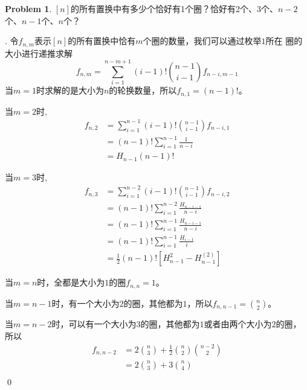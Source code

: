 \documentclass[UTF8]{ctexart}
\newenvironment{sol}
  {\par\vspace{3mm}\noindent{\it Solution}.}
  {\qed \\ \medskip}
\theoremstyle{definition}
\newtheorem{problem}{Problem}
\begin{document}
\begin{problem}
$[n]$的所有置换中有多少个恰好有1个圈？恰好有2个、3个、$n-2$个、$n-1$个、$n$个？

\begin{sol}
  令$f_{n,m}$表示$[n]$的所有置换中恰有$m$个圈的数量，我们可以通过枚举$1$所在
  圈的大小进行递推求解
  $$
  f_{n,m}=\sum_{i=1}^{n-m+1}(i-1)!\binom{n-1}{i-1}f_{n-i,m-1}
  $$
  当$m=1$时求解的是大小为$n$的轮换数量，所以$f_{n,1}=(n-1)!$。
  
  当$m=2$时,
  \begin{align*}
    f_{n,2}
    &=\sum_{i=1}^{n-1}(i-1)!\binom{n-1}{i-1}f_{n-i,1}\\
    &=(n-1)!\sum_{i=1}^{n-1}\frac 1 {n-i}\\
    &=H_{n-1}(n-1)!
  \end{align*}

  当$m=3$时,
  \begin{align*}
      f_{n,3}
      &=\sum_{i=1}^{n-2}(i-1)!\binom{n-1}{i-1}f_{n-i,2}\\
      &=(n-1)!\sum_{i=1}^{n-2}\frac {H_{n-i-1}} {n-i}\\
      &=(n-1)!\sum_{i=1}^{n-1}\frac {H_{n-i-1}} {n-i}\\
      &=(n-1)!\sum_{i=1}^{n-1}\frac {H_{i-1}} {i}\\
      &=\frac 1 2(n-1)![H_{n-1}^2-H^{(2)}_{n-1}]
  \end{align*}

  当$m=n$时，全都是大小为$1$的圈$f_{n,n}=1$。

  当$m=n-1$时，有一个大小为$2$的圈，其他都为$1$，所以$f_{n,n-1}=\binom{n}{2}$。

  当$m=n-2$时，可以有一个大小为$3$的圈，其他都为$1$或者由两个大小为$2$的圈，所以
  \begin{align*}
    f_{n,n-2}
    &=2\binom{n}{3}+\frac 1 2 \binom{n}{2}\binom{n-2}{2} \\
    &=2\binom{n}{3}+3\binom{n}{4} \\
  \end{align*}
\end{sol}
\end{problem}
\end{document}
